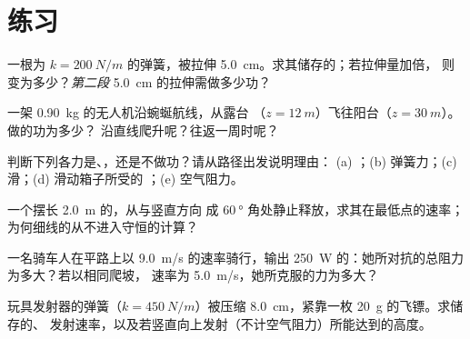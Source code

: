 \section{练习}

\begin{exercise}[$\star$]\label{exo:g12:work-and-energy:1}
一根为 $k = \qty{200}{N/m}$ 的弹簧，被拉伸
\qty{5.0}{cm}。求其储存的；若拉伸量加倍，
则变为多少？\emph{第二段} \qty{5.0}{cm} 的拉伸需做多少功？
\end{exercise}

\begin{exercise}[$\star$]\label{exo:g12:work-and-energy:2}
一架 \qty{0.90}{kg} 的无人机沿蜿蜒航线，从露台
（$z = \qty{12}{m}$）飞往阳台（$z = \qty{30}{m}$）。做的功为多少？
沿直线爬升呢？往返一周时呢？
\end{exercise}

\begin{exercise}[$\star$]\label{exo:g12:work-and-energy:3}
判断下列各力是、，还是不做功？请从路径出发说明理由：
(a) ；(b) 弹簧力；(c) 滑；(d) 滑动箱子所受的
；(e) 空气阻力。
\end{exercise}

\begin{exercise}[$\star$]\label{exo:g12:work-and-energy:4}
一个摆长 \qty{2.0}{m} 的，从与竖直方向
成 $\qty{60}{\degree}$ 角处静止释放，求其在最低点的速率；
为何细线的从不进入守恒的计算？
\end{exercise}

\begin{exercise}[$\star$]\label{exo:g12:work-and-energy:5}
一名骑车人在平路上以 \qty{9.0}{m/s} 的速率骑行，输出
\qty{250}{W} 的：她所对抗的总阻力为多大？若以相同爬坡，
速率为 \qty{5.0}{m/s}，她所克服的力为多大？
\end{exercise}

\begin{exercise}[$\star\star$]\label{exo:g12:work-and-energy:6}
玩具发射器的弹簧（$k = \qty{450}{N/m}$）被压缩
\qty{8.0}{cm}，紧靠一枚 \qty{20}{g} 的飞镖。求储存的、
发射速率，以及若竖直向上发射（不计空气阻力）所能达到的高度。
\end{exercise}

